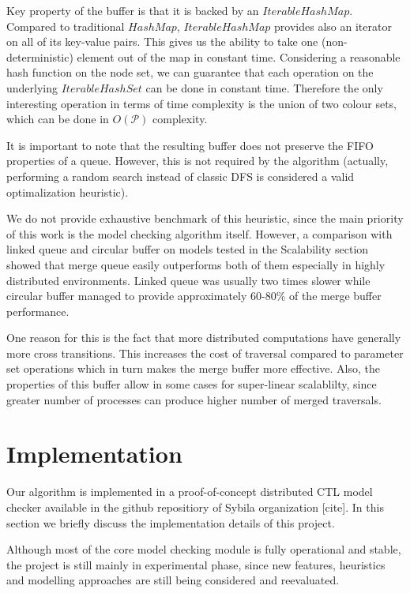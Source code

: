 \documentclass[12pt,oneside,draft]{fithesis2}
\newcommand{\params}{\mathcal{P}}
\begin{document}
			Key property of the buffer is that it is backed by an $IterableHashMap$. Compared to traditional $HashMap$, $IterableHashMap$ provides also an iterator on all of its key-value pairs. This gives us the ability to take one (non-deterministic) element out of the map in constant time. Considering a reasonable hash function on the node set, we can guarantee that each operation on the underlying $IterableHashSet$ can be done in constant time. Therefore the only interesting operation in terms of time complexity is the union of two colour sets, which can be done in $O(\params)$ complexity.
			
			It is important to note that the resulting buffer does not preserve the FIFO properties of a queue. However, this is not required by the algorithm (actually, performing a random search instead of classic DFS is considered a valid optimalization heuristic).
			
			We do not provide exhaustive benchmark of this heuristic, since the main priority of this work is the model checking algorithm itself. However, a comparison with linked queue and circular buffer on models tested in the Scalability section showed that merge queue easily outperforms both of them especially in highly distributed environments. Linked queue was usually two times slower while circular buffer managed to provide approximately 60-80\% of the merge buffer performance. 
			
			One reason for this is the fact that more distributed computations have generally more cross transitions. This increases the cost of traversal compared to parameter set operations which in turn makes the merge buffer more effective. Also, the properties of this buffer allow in some cases for super-linear scalablilty, since greater number of processes can produce higher number of merged traversals. 
			
							
	
	\chapter{Implementation}

		Our algorithm is implemented in a proof-of-concept distributed CTL model checker available in the github repositiory of Sybila organization [cite]. In this section we briefly discuss the implementation details of this project. 
		
		Although most of the core model checking module is fully operational and stable, the project is still mainly in experimental phase, since new features, heuristics and modelling approaches are still being considered and reevaluated.
\end{document}
